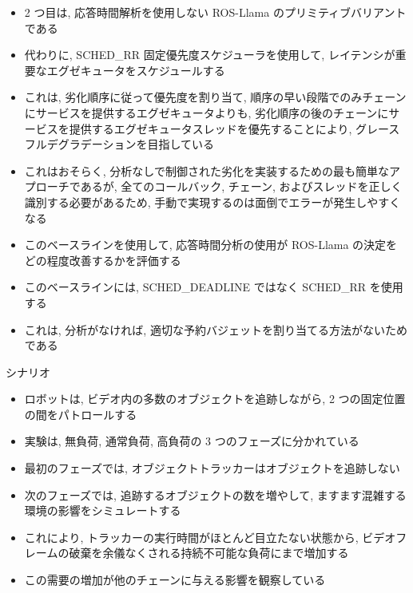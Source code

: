 \begin{frame}{}
    \begin{itemize}
        \item 2 つ目は, 応答時間解析を使用しない ROS-Llama のプリミティブバリアントである
\item 代わりに, SCHED\_RR 固定優先度スケジューラを使用して, レイテンシが重要なエグゼキュータをスケジュールする
\item これは, 劣化順序に従って優先度を割り当て, 順序の早い段階でのみチェーンにサービスを提供するエグゼキュータよりも, 劣化順序の後のチェーンにサービスを提供するエグゼキュータスレッドを優先することにより, グレースフルデグラデーションを目指している
    \end{itemize}
\end{frame}

\begin{frame}{}
    \begin{itemize}
        \item これはおそらく, 分析なしで制御された劣化を実装するための最も簡単なアプローチであるが, 全てのコールバック, チェーン, およびスレッドを正しく識別する必要があるため, 手動で実現するのは面倒でエラーが発生しやすくなる
\item このベースラインを使用して, 応答時間分析の使用が ROS-Llama の決定をどの程度改善するかを評価する
\item このベースラインには, SCHED\_DEADLINE ではなく SCHED\_RR を使用する
\item これは, 分析がなければ, 適切な予約バジェットを割り当てる方法がないためである
    \end{itemize}
\end{frame}

\begin{frame}{シナリオ}
    \begin{itemize}
        \item ロボットは, ビデオ内の多数のオブジェクトを追跡しながら, 2 つの固定位置の間をパトロールする
\item 実験は, 無負荷, 通常負荷, 高負荷の 3 つのフェーズに分かれている
\item 最初のフェーズでは, オブジェクトトラッカーはオブジェクトを追跡しない
\item 次のフェーズでは, 追跡するオブジェクトの数を増やして, ますます混雑する環境の影響をシミュレートする
\item これにより, トラッカーの実行時間がほとんど目立たない状態から, ビデオフレームの破棄を余儀なくされる持続不可能な負荷にまで増加する
\item この需要の増加が他のチェーンに与える影響を観察している
    \end{itemize}
\end{frame}


